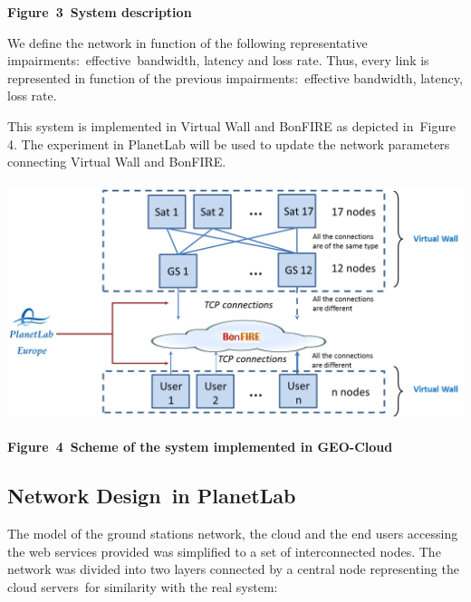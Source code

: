 \documentclass[a4paper]{article}
\begin{document}
{\centering\bfseries
\label{bkm:Ref387314325}Figure\ 3\ System description
\par}


\bigskip

We define the network in function of the following representative
impairments:\ effective\ bandwidth, latency and loss rate. Thus, every
link is represented in function of the previous impairments:\ effective
bandwidth, latency, loss rate.

This system is implemented in Virtual Wall and BonFIRE as depicted
in\ Figure 4. The experiment in PlanetLab will be used to update the
network parameters connecting Virtual Wall and BonFIRE.

{\centering 
\includegraphics[width=5.48738in,height=2.73818in]{ple-img6.png} \par}

{\centering\bfseries
\label{bkm:Ref387318557}Figure\ 4\ Scheme of the system implemented in
GEO-Cloud
\par}


\bigskip

\subsection[Network Design\ in PlanetLab]{Network Design\ in PlanetLab}
\hypertarget{Toc387315386}{}
\bigskip

The model of the ground stations network, the cloud and the end users
accessing the web services provided was simplified to a set of
interconnected nodes. The network was divided into two layers connected
by a central node representing the cloud servers\ for similarity with
the real system:\ 
\end{document}
